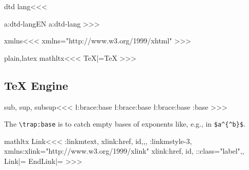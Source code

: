 \<dtd lang\><<<
\expandafter
\ifx \csname a:dtd-lang\endcsname\relax EN\else
  \csname a:dtd-lang\endcsname
\fi
>>>


\<xmlns\><<<
xmlns="http://www.w3.org/1999/xhtml"
>>>


\<plain,latex mathltx\><<<
\let\mml:TeX|=\TeX
\def\TeX{\ifmathltx 
   \HCode{<mtext
      \mml:class="TeX">TeX</mtext>}\else \mml:TeX\fi}
>>>

\subsection{TeX Engine}

\<sub, sup, subsup\><<<
   {
     {\l:brace}\trap:base}
   {}
   {
      {\l:brace}\trap:base}
   {}
   {
      {\l:brace}\trap:base}
   {\trap:base}
   {}
\def\trap:base{{\HCode{}}}
>>>

The \verb'\trap:base' is to catch empty bases of exponents like, e.g.,
in \verb'$a^{^b}$'.


\<mathltx Link\><<<
\LinkCommand\mtxt:link{mtext, xlink:href, id,,,}
\LinkCommand\msp:link{mstyle-3,%
   xmlns:xlink="http://www.w3.org/1999/xlink" xlink:href,
   id, \mml:class="label",,}
\let\M:Link|=\Link
\def\Link{\ifmathltx
     \ifmtext |<end mtext space|>\HCode{\%\Hnewline\%\string\begin{ref}}%
              \bgroup \let\:newlnch\space
              \expandafter\expandafter\expandafter\mtxt:link
     \else    \expandafter\expandafter\expandafter\msp:link\fi
   \else \expandafter\M:Link\fi}
\let\M:EndLink|=\EndLink
\def\EndLink{\ifmathltx 
     \ifmtext    |<end mtext space|>%
        \egroup \HCode{\%\Hnewline\%}\Endmtxt:link
        \HCode{\string\end{ref}\Hnewline}|<start mtext space|>%
     \else  \HCode{</mstyle-5><!--endlabel-->}\fi
   \else \expandafter\M:EndLink\fi}
>>>







